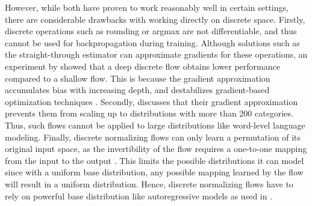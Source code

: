 However, while both have proven to work reasonably well in certain settings, there are considerable drawbacks with working directly on discrete space.
Firstly, discrete operations such as rounding or argmax are not differentiable, and thus cannot be used for backpropagation during training. 
Although solutions such as the straight-through estimator \cite{STEGradientEstimator} can approximate gradients for these operations, an experiment by \citet{IntegerNF} showed that a deep discrete flow obtains lower performance compared to a shallow flow.
This is because the gradient approximation accumulates bias with increasing depth, and destabilizes gradient-based optimization techniques \cite{IntegerNF, IDF++}.
Secondly, \citet{TranDiscreteFlows} discusses that their gradient approximation prevents them from scaling up to distributions with more than 200 categories.
Thus, such flows cannot be applied to large distributions like word-level language modeling.
Finally, discrete normalizing flows can only learn a permutation of its original input space, as the invertibility of the flow requires a one-to-one mapping from the input to the output \cite{SemiDiscreteNFSequence, IDF++, NormalizingFlowsOverview2}.
This limits the possible distributions it can model since with a uniform base distribution, any possible mapping learned by the flow will result in a uniform distribution.
Hence, discrete normalizing flows have to rely on powerful base distribution like autoregressive models as used in \cite{IntegerNF, TranDiscreteFlows}.

